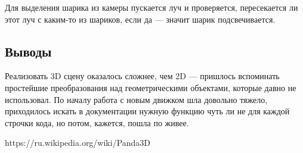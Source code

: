 \documentclass[12pt]{article}
\begin{document}
Для выделения шарика из камеры пускается луч и проверяется, пересекается ли этот луч с каким-то из шариков,
если да --- значит шарик подсвечивается.

\subsection*{Выводы}
Реализовать 3D сцену оказалось сложнее, чем 2D --- пришлось вспоминать
простейшие преобразования над геометрическими объектами, которые давно
не использовал. По началу работа с новым движком шла довольно тяжело,
приходилось искать в документации нужную функцию чуть ли не для каждой строчки
кода, но потом, кажется, пошла по живее.

\begin{thebibliography}{}
 https://ru.wikipedia.org/wiki/Panda3D
\end{thebibliography}
\end{document}
